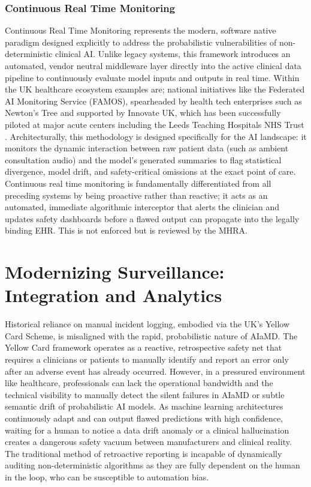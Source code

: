 \documentclass[11pt,a4paper]{article}
\begin{document}
\subsubsection{Continuous Real Time Monitoring}
\label{sec:Continuous Real Time Monitoring}
Continuous Real Time Monitoring represents the modern, software native paradigm designed explicitly to address the probabilistic vulnerabilities of non-deterministic clinical AI. Unlike legacy systems, this framework introduces an automated, vendor neutral middleware layer directly into the active clinical data pipeline to continuously evaluate model inputs and outputs in real time.  Within the UK healthcare ecosystem examples are; national initiatives like the Federated AI Monitoring Service (FAMOS), spearheaded by health tech enterprises such as Newton's Tree and supported by Innovate UK, which has been successfully piloted at major acute centers including the Leeds Teaching Hospitals NHS Trust \cite{newtonstree2026} . Architecturally, this methodology is designed specifically for the AI landscape: it monitors the dynamic interaction between raw patient data (such as ambient consultation audio) and the model's generated summaries to flag statistical divergence, model drift, and safety-critical omissions at the exact point of care. Continuous real time monitoring is fundamentally differentiated from all preceding systems by being proactive rather than reactive; it acts as an automated, immediate algorithmic interceptor that alerts the clinician and updates safety dashboards before  a flawed output can propagate into the legally binding EHR. This is not enforced but is reviewed by the MHRA.




\section{Modernizing Surveillance: Integration and Analytics}
\label{sec:Modernizing Surveillance: Integration and Analytics}

Historical reliance on manual incident logging, embodied via the UK's Yellow Card Scheme, is misaligned with the rapid, probabilistic nature of AIaMD. The Yellow Card framework operates as a reactive, retrospective safety net that requires a clinicians or patients to manually identify and report an error only after an adverse event has already occurred. However, in a pressured environment like healthcare, professionals can lack the operational bandwidth and the technical visibility to manually detect the silent failures in AIaMD or subtle semantic drift  of probabilistic AI models. As machine learning architectures continuously adapt and can output flawed predictions with high confidence, waiting for a human to notice a data drift anomaly or a clinical hallucination creates a dangerous safety vacuum between manufacturers and clinical reality. The traditional method of retroactive reporting is incapable of dynamically auditing non-deterministic algorithms as they are fully dependent on the human in the loop, who can be susceptible to automation bias.
\end{document}

